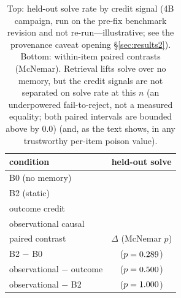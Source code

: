 \begin{table}[t]
\centering\small
\setlength{\tabcolsep}{5pt}
\begin{tabular}{lc}
\toprule
condition & held-out solve \\
\midrule
B0 (no memory)       & \CampBzero{} \\
B2 (static)          & \CampBtwo{} \\
outcome credit       & \CampOutcome{} \\
observational causal & \CampObs{} \\
\midrule
paired contrast & $\Delta$ (McNemar $p$) \\
\midrule
B2 $-$ B0                  & \BtwoVsBzero{} ($p=0.289{}$) \\
observational $-$ outcome  & \ObsVsOutcome{} ($p=0.500{}$) \\
observational $-$ B2       & \ObsVsBtwo{} ($p=1.000{}$) \\
\bottomrule
\end{tabular}
\caption{Top: held-out solve rate by credit signal (4B campaign, run on the pre-fix
benchmark revision and not re-run---illustrative; see the provenance caveat opening
\S\ref{sec:results2}). Bottom: within-item paired
contrasts (McNemar). Retrieval lifts solve over no memory, but the credit signals
are not separated on solve rate at this $n$ (an underpowered fail-to-reject, not a measured
equality; both paired intervals are bounded above by $0.0$) (and, as the text shows, in any trustworthy
per-item poison value).}
\label{tab:solve}
\end{table}

